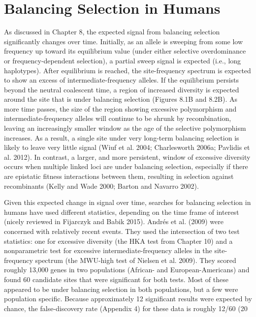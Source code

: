 \documentclass{article}
\begin{document}
\section{Balancing Selection in Humans}
As discussed in Chapter 8, the expected signal from balancing selection significantly changes over time. Initially, as an allele is sweeping from some low frequency up toward its equilibrium value (under either selective overdominance or frequency-dependent selection), a partial sweep signal is expected (i.e., long haplotypes). After equilibrium is reached, the site-frequency spectrum is expected to show an excess of intermediate-frequency alleles. If the equilibrium persists beyond the neutral coalescent time, a region of increased diversity is expected around the site that is under balancing selection (Figures 8.1B and 8.2B). As more time passes, the size of the region showing excessive polymorphism and intermediate-frequency alleles will continue to be shrunk by recombination, leaving an increasingly smaller window as the age of the selective polymorphism increases. As a result, a single site under very long-term balancing selection is likely to leave very little signal (Wiuf et al. 2004; Charlesworth 2006a; Pavlidis et al. 2012). In contrast, a larger, and more persistent, window of excessive diversity occurs when multiple linked loci are under balancing selection, especially if there are epistatic fitness interactions between them, resulting in selection against recombinants (Kelly and Wade 2000; Barton and Navarro 2002).

Given this expected change in signal over time, searches for balancing selection in humans have used different statistics, depending on the time frame of interest (nicely reviewed in Fijarczyk and Babik 2015). Andrés et al. (2009) were concerned with relatively recent events. They used the intersection of two test statistics: one for excessive diversity (the HKA test from Chapter 10) and a nonparametric test for excessive intermediate-frequency alleles in the site-frequency spectrum (the MWU-high test of Nielsen et al. 2009). They scored roughly 13,000 genes in two populations (African- and European-Americans) and found 60 candidate sites that were significant for both tests. Most of these appeared to be under balancing selection in both populations, but a few were population specific. Because approximately 12 significant results were expected by chance, the false-discovery rate (Appendix 4) for these data is roughly 12/60 (20%
\end{document}
